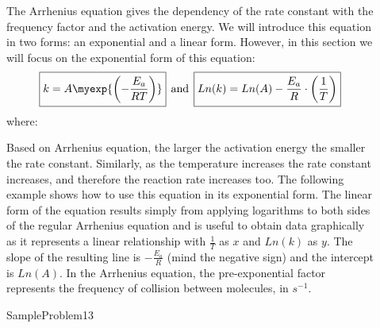 \documentclass[main.tex]{subfiles}
\newcommand\chapterlabel{Ch-kinetics}
\begin{document}
\begin{description}
\item[] 
The Arrhenius equation gives the dependency of the rate constant with the frequency factor and the activation energy. We will introduce this equation in two forms: an exponential and a linear form. However, in this section we will focus on the exponential form of this equation:
\begin{equation}
\boxed{ k=A\myexp{\left(-\frac{E_a}{RT}\right)}} \>\>\text{and} \>\> \boxed{  Ln(k)=Ln(A)  -\frac{E_a}{R} \cdot \left(\frac{1}{T}\right) }
\label{\chapterlabel:equation4}
\end{equation}
where:
Based on Arrhenius equation, the larger the activation energy the smaller the rate constant. Similarly, as the temperature increases the rate constant increases, and therefore the reaction rate increases too. The following example shows how to use this equation in its exponential form.
The linear form of the equation results simply from applying logarithms to both sides of the regular Arrhenius equation and is useful to obtain data graphically as it represents a linear relationship with $\frac{1}{T}$ as $x$ and $Ln(k)$ as $y$. The slope of the resulting line is $-\frac{E_a}{R}$ (mind the negative sign) and the intercept is $Ln(A)$. In the Arrhenius equation, the pre-exponential factor represents the frequency of collision between molecules, in $s^{-1}$. 


  {SampleProblem13}



\end{description}
\end{document}
